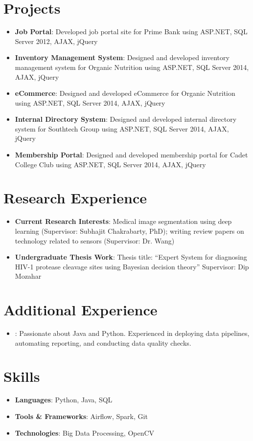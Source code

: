 \documentclass[letterpaper,11pt]{article}
\newcommand{\resumeItem}[2]{
  \item\small{
    \textbf{#1}{: #2 \vspace{-2pt}}
  }
}
\newcommand{\resumeSubItem}[2]{\resumeItem{#1}{#2}\vspace{-4pt}}
\newcommand{\resumeSubHeadingListStart}{\begin{itemize}[leftmargin=*]}
\newcommand{\resumeSubHeadingListEnd}{\end{itemize}}
\begin{document}
\section{Projects}
  \resumeSubHeadingListStart
    \resumeSubItem{Job Portal}
      {Developed job portal site for Prime Bank using ASP.NET, SQL Server 2012, AJAX, jQuery}
    \resumeSubItem{Inventory Management System}
      {Designed and developed inventory management system for Organic Nutrition using ASP.NET, SQL Server 2014, AJAX, jQuery}
    \resumeSubItem{eCommerce}
      {Designed and developed eCommerce for Organic Nutrition using ASP.NET, SQL Server 2014, AJAX, jQuery}
    \resumeSubItem{Internal Directory System}
      {Designed and developed internal directory system for Southtech Group using ASP.NET, SQL Server 2014, AJAX, jQuery}
    \resumeSubItem{Membership Portal}
      {Designed and developed membership portal for Cadet College Club using ASP.NET, SQL Server 2014, AJAX, jQuery}
  \resumeSubHeadingListEnd

\section{Research Experience}
\resumeSubHeadingListStart
    \resumeSubItem{Current Research Interests}
      {Medical image segmentation using deep learning (Supervisor: Subhajit Chakrabarty, PhD); writing review papers on technology related to sensors (Supervisor: Dr. Wang)}
    \resumeSubItem{Undergraduate Thesis Work}
      {Thesis title: “Expert System for diagnosing HIV-1 protease cleavage sites using Bayesian decision theory”}
      {Supervisor: Dip Mozahar}
\resumeSubHeadingListEnd

\section{Additional Experience}
\resumeSubHeadingListStart
    \resumeSubItem{}
      {Passionate about Java and Python. Experienced in deploying data pipelines, automating reporting, and conducting data quality checks.}
\resumeSubHeadingListEnd

\section{Skills}
\resumeSubHeadingListStart
    \resumeSubItem{Languages}
      {Python, Java, SQL}
    \resumeSubItem{Tools \& Frameworks}
      {Airflow, Spark, Git}
    \resumeSubItem{Technologies}
      {Big Data Processing, OpenCV}
\resumeSubHeadingListEnd
\end{document}
